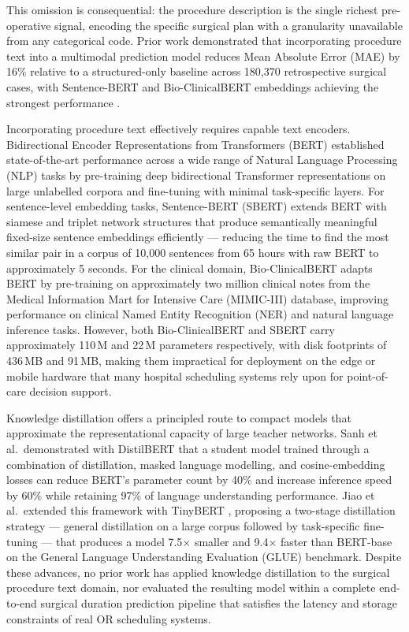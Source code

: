 \documentclass[3p]{elsarticle}
\begin{document}
This omission is consequential: the procedure description is the single richest pre-operative signal, encoding the specific surgical plan with a granularity unavailable from any categorical code. Prior work demonstrated that incorporating procedure text into a multimodal prediction model reduces Mean Absolute Error (MAE) by 16\% relative to a structured-only baseline across 180{,}370 retrospective surgical cases, with Sentence-BERT and Bio-ClinicalBERT embeddings achieving the strongest performance \cite{noorchenarboo2026benchmarking}.

Incorporating procedure text effectively requires capable text encoders. Bidirectional Encoder Representations from Transformers (BERT) \cite{devlin2019bert} established state-of-the-art performance across a wide range of Natural Language Processing (NLP) tasks by pre-training deep bidirectional Transformer representations on large unlabelled corpora and fine-tuning with minimal task-specific layers. For sentence-level embedding tasks, Sentence-BERT (SBERT) \cite{reimers2019sentence} extends BERT with siamese and triplet network structures that produce semantically meaningful fixed-size sentence embeddings efficiently — reducing the time to find the most similar pair in a corpus of 10{,}000 sentences from 65 hours with raw BERT to approximately 5 seconds. For the clinical domain, Bio-ClinicalBERT \cite{alsentzer2019publicly} adapts BERT by pre-training on approximately two million clinical notes from the Medical Information Mart for Intensive Care (MIMIC-III) database, improving performance on clinical Named Entity Recognition (NER) and natural language inference tasks. However, both Bio-ClinicalBERT and SBERT carry approximately 110\,M and 22\,M parameters respectively, with disk footprints of 436\,MB and 91\,MB, making them impractical for deployment on the edge or mobile hardware that many hospital scheduling systems rely upon for point-of-care decision support.

Knowledge distillation offers a principled route to compact models that approximate the representational capacity of large teacher networks. Sanh et al.\ demonstrated with DistilBERT \cite{sanh2019distilbert} that a student model trained through a combination of distillation, masked language modelling, and cosine-embedding losses can reduce BERT's parameter count by 40\% and increase inference speed by 60\% while retaining 97\% of language understanding performance. Jiao et al.\ extended this framework with TinyBERT \cite{jiao2020tinybert}, proposing a two-stage distillation strategy — general distillation on a large corpus followed by task-specific fine-tuning — that produces a model 7.5$\times$ smaller and 9.4$\times$ faster than BERT-base on the General Language Understanding Evaluation (GLUE) benchmark. Despite these advances, no prior work has applied knowledge distillation to the surgical procedure text domain, nor evaluated the resulting model within a complete end-to-end surgical duration prediction pipeline that satisfies the latency and storage constraints of real OR scheduling systems.
\end{document}
